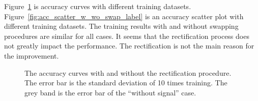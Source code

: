 \documentclass[12pt]{article}
\begin{document}
		Figure~\ref{fig:acc_curve_w_wo_swap_label} is accuracy curves with different training datasets. Figure~\ref{fig:acc_scatter_w_wo_swap_label} is an accuracy scatter plot with different training datasets. The training results with and without swapping procedures are similar for all cases. It seems that the rectification process does not greatly impact the performance. The rectification is not the main reason for the improvement.
		\begin{figure}[htpb]
			\centering
			\caption{The accuracy curves with and without the rectification procedure. The error bar is the standard deviation of 10 times training. The grey band is the error bar of the ``without signal'' case.}
			\label{fig:acc_curve_w_wo_swap_label}
		\end{figure}
\end{document}
